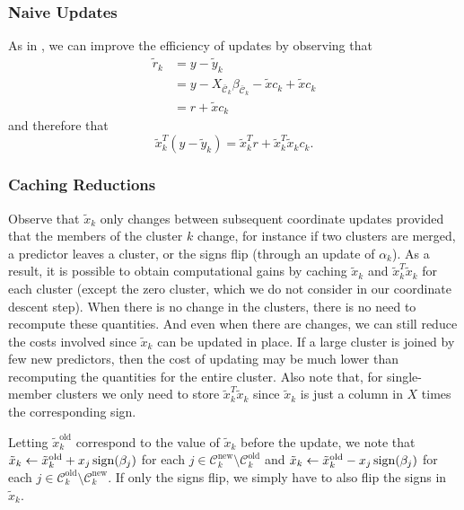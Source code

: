 \subsubsection{Naive Updates}

As in \textcite{friedman2010}, we can improve the efficiency of updates by observing that
\begin{equation*}
  \begin{aligned}
    \tilde r_k & = y - \tilde y_k                                                                       \\
               & = y - X_{\bar{\mathcal{C}}_k}\beta_{\bar{\mathcal{C}}_k} - \tilde x c_k + \tilde x c_k \\
               & = r + \tilde x c_k
  \end{aligned}
\end{equation*}
and therefore that
\begin{equation}
  \label{eq:naive-update}
  \tilde x_k^T (y - \tilde y_k) = \tilde x_k^T r + \tilde x_k^T \tilde x_k c_k.
\end{equation}

\subsubsection{Caching Reductions}

Observe that \(\tilde x_k\) only changes between subsequent coordinate updates provided that the members of the cluster \(k\) change, for instance if two clusters are merged, a predictor leaves a cluster, or the signs flip (through an update of \(\alpha_k\)).
As a result, it is possible to obtain computational gains by caching \(\tilde x_k\) and \(\tilde x_k^T \tilde x_k\) for each cluster (except the zero cluster, which we do not consider in our coordinate descent step).
When there is no change in the clusters, there is no need to recompute these quantities.
And even when there are changes, we can still reduce the costs involved since \(\tilde x_k\) can be updated in place.
If a large cluster is joined by few new predictors, then the cost of updating may be much lower than recomputing the quantities for the entire cluster.
Also note that, for single-member clusters we only need to store \(\tilde x_k^T \tilde x_k\) since \(\tilde x_k\) is just a column in \(X\) times the corresponding sign.

Letting \(\tilde x_k^\text{old}\) correspond to the value of \(\tilde x_k\) before the update, we note that \(\tilde x_k \gets \tilde x_k^\text{old} + x_j \operatorname{sign}(\beta_j)\) for each \(j \in \mathcal{C}_k^\text{new} \setminus \mathcal{C}_k^\text{old}\) and \(\tilde x_k \gets \tilde x_k^\text{old} - x_j \operatorname{sign}(\beta_j)\) for each \(j \in \mathcal{C}_k^\text{old} \setminus \mathcal{C}_k^\text{new}\).
If only the signs flip, we simply have to also flip the signs in \(\tilde x_k\).

